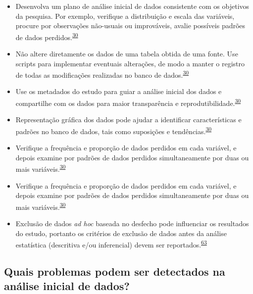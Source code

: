 \documentclass[
]{book}
\begin{document}
\begin{itemize}
\item
  Desenvolva um plano de análise inicial de dados consistente com os objetivos da pesquisa. Por exemplo, verifique a distribuição e escala das variáveis, procure por observações não-usuais ou improváveis, avalie possíveis padrões de dados perdidos.\textsuperscript{\protect\hyperlink{ref-Baillie2022}{30}}
\item
  Não altere diretamente os dados de uma tabela obtida de uma fonte. Use scripts para implementar eventuais alterações, de modo a manter o registro de todas as modificações realizadas no banco de dados.\textsuperscript{\protect\hyperlink{ref-Baillie2022}{30}}
\item
  Use os metadados do estudo para guiar a análise inicial dos dados e compartilhe com os dados para maior transparência e reprodutibilidade.\textsuperscript{\protect\hyperlink{ref-Baillie2022}{30}}
\item
  Representação gráfica dos dados pode ajudar a identificar características e padrões no banco de dados, tais como suposições e tendências.\textsuperscript{\protect\hyperlink{ref-Baillie2022}{30}}
\item
  Verifique a frequência e proporção de dados perdidos em cada variável, e depois examine por padrões de dados perdidos simultaneamente por duas ou mais variáveis.\textsuperscript{\protect\hyperlink{ref-Baillie2022}{30}}
\item
  Verifique a frequência e proporção de dados perdidos em cada variável, e depois examine por padrões de dados perdidos simultaneamente por duas ou mais variáveis.\textsuperscript{\protect\hyperlink{ref-Baillie2022}{30}}
\item
  Exclusão de dados \emph{ad hoc} baseada no desfecho pode influenciar os resultados do estudo, portanto os critérios de exclusão de dados antes da análise estatística (descritiva e/ou inferencial) devem ser reportados.\textsuperscript{\protect\hyperlink{ref-Landis2012}{63}}
\end{itemize}

\hypertarget{quais-problemas-podem-ser-detectados-na-anuxe1lise-inicial-de-dados}{%
\subsection{Quais problemas podem ser detectados na análise inicial de dados?}\label{quais-problemas-podem-ser-detectados-na-anuxe1lise-inicial-de-dados}}
\end{document}
